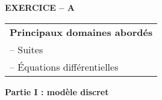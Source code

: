 \textbf{EXERCICE -- A}

\medskip

\begin{tabular}{|l|}\hline
\textbf{Principaux domaines abordés}\\
-- Suites\\
-- Équations différentielles\\ \hline
\end{tabular}


%

\bigskip

\textbf{Partie I : modèle discret}

\medskip

%
%
%

\medskip

